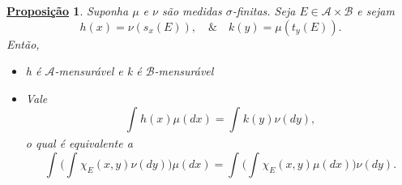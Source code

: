 \documentclass{article}
\newtheorem*{prop*}{\underline{Proposi\c c\~ao}}
\begin{document}
\begin{prop*}

  Suponha \(\mu \) e \(\nu\) são medidas \(\sigma \)-finitas. Seja \(E\in \mathcal{A}\times \mathcal{B}\) e sejam
    \[
      h(x) = \nu(s_x(E)),\quad\&\quad k(y) = \mu (t_y(E)).
    \]
  Então, 
 \begin{itemize}
   \item[i)] h é \(\mathcal{A}\)-mensurável e k é \(\mathcal{B}\)-mensurável
     \item[ii)] Vale 
       \[
         \int_{}h(x) \mu (dx) = \int_{}^{}k(y)\nu(dy),
       \]
      o qual é equivalente a 
        \[
          \int_{}^{}\biggl(\int_{}^{}\chi_{E}(x, y)\nu(dy)\biggr)\mu (dx) = \int_{}^{}\biggl(\int_{}^{}\chi_{E}(x, y)\mu (dx)\biggr)\nu(dy).
        \]
 \end{itemize}
\end{prop*}
\end{document}
